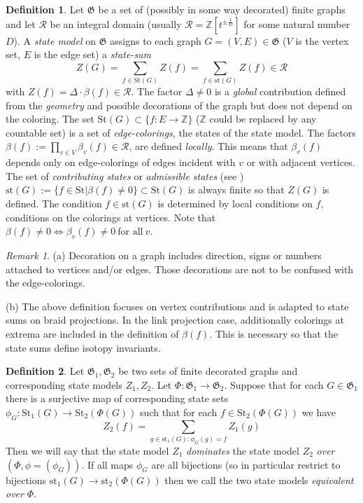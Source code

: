 \documentclass[11pt]{article}
\theoremstyle{definition}
\newtheorem{defn}{Definition}[section]
\theoremstyle{remark}
\newtheorem*{rem}{Remark}
\theoremstyle{remark}
\begin{document}
\begin{defn} Let $\mathfrak{G}$ be a set of (possibly in some way decorated) finite graphs and let $\mathcal{R}$ be an integral domain (usually $\mathcal{R}=\mathbb{Z}[t^{\pm \frac{1}{D}}]$ for some natural number $D$).
A  \textit{state model} on $\mathfrak{G}$ assigns to each graph $G=(V,E)\in \mathfrak{G}$ ($V$ is the vertex set, $E$ is the edge set) a \textit{state-sum}
\begin{equation*}
Z(G)=\sum_{f\in \textrm{St}(G)}Z(f)=\sum_{f\in \textrm{st}(G)}Z(f)\in \mathcal{R}
\end{equation*}
with $Z(f)=\Delta \cdot \beta (f)\in \mathcal{R}$. The factor $\Delta \neq 0$ is a \textit{global} contribution defined from the \textit{geometry} and possible decorations of the graph but does not depend on the coloring. 
The set $\textrm{St}(G)\subset \{f: E\rightarrow \mathbb{Z}\}$ ($\mathbb{Z}$ could be replaced by any countable set) is a set of \textit{edge-colorings}, the states of the state model. The factors $\beta (f):=\prod_{v\in V}\beta_v(f)\in \mathcal{R}$, are defined \textit{locally}. This means that $\beta_v(f)$ depends only on edge-colorings of edges incident with $v$ or with adjacent vertices. The set of \textit{contributing states} or \textit{admissible states} (see \cite{T})
$\textrm{st}(G):=\{f\in \textrm{St}|\beta (f)\neq 0\}\subset \textrm{St}(G)$ is always finite so that $Z(G)$ is defined. The condition $f\in \textrm{st}(G)$ is determined by local conditions on $f$, conditions on the colorings at vertices. Note that $\beta (f)\neq 0 \Longleftrightarrow \beta_v(f)\neq 0 \ \textrm{for all}\  v$. 
\end{defn}

\begin{rem} (a) Decoration on a graph includes direction, signs or numbers attached to vertices and/or edges. Those decorations are not to be confused with the edge-colorings.

\noindent (b) The above definition focuses on vertex contributions and is adapted to state sums on braid projections. In the link projection case, additionally colorings at extrema are included in the definition of $\beta (f)$. This is necessary so that the state sums define isotopy invariants. \end{rem}

\begin{defn} \label{defn: equivalency}
Let $\mathfrak{G}_1,\mathfrak{G}_2$ be two sets of finite decorated graphs and corresponding state models 
$Z_1,Z_2$. Let
$\Phi: \mathfrak{G}_1\rightarrow \mathfrak{G}_2$. Suppose that for each $G\in \mathfrak{G}_1$ there  
is a surjective map of corresponding state sets $\phi_G: \textrm{St}_1(G)\rightarrow \textrm{St}_2(\Phi (G))$ such that for each $f\in \textrm{St}_2(\Phi(G))$ we have
$$Z_2(f)=\sum_{g\in \textrm{st}_1(G): \phi _G(g)=f}Z_1(g)$$
Then we will say that the state model $Z_1$ \textit{dominates} the state model $Z_2$ \textit{over} $(\Phi ,\phi =(\phi_G)) $. If all maps $\phi_G$ are all bijections (so in particular restrict to bijections $\textrm{st}_1(G)\rightarrow \textrm{st}_2(\Phi (G))$
then we call the two state models \textit{equivalent over} $\Phi $.
 \end{defn}
\end{document}
